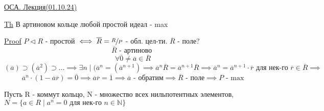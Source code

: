 \documentclass[a4paper]{article}
\begin{document}
\begin{center}
    \underline{ОСА. Лекция(01.10.24)}
\end{center}

\begin{tcolorbox}
    \underline{Th} В артиновом кольце любой простой идеал - max

    \underline{Proof} $ P \lhd R $ - простой $ \iff \overline{R} = \sfrac{R}{P}  $ 
    - обл. цел-ти. $ \overline{R} $ - поле?
    \[
        \overline{R} \text{ - артиново }
    \]
    \[
        \forall \overline{0} \neq \overline{a} \in \overline{R}
    \]
    \[
        (\overline{a}) \supset (\overline{a}^2) \supset \dots \implies
        \exists n \; |\; (\overline{a}^{n} = (\overline{a}^{n+1}) \implies
        \overline{a}^{n}\overline{R} = \overline{a}^{n+1}\overline{R} \implies
        \overline{a}^{n} = \overline{a}^{n+1}\cdot \overline{r}
        \text{ для нек-го } \overline{r} \in \overline{R} \implies
    \]
    \[
        \overline{a}^{n} \cdot (1 - \overline{a}\overline{r}) = \overline{0}
        \implies \overline{a}\overline{r} = \overline{1} \implies \overline{a}
        \text{ - обратим} \implies \overline{R} \text{ - поле} \implies
        P \text{ - max}
    \]
\end{tcolorbox}

Пусть R - коммут кольцо, N - множество всех нильпотентных элементов,
$ N = \{ a \in R \; | \; a^{n}= 0 \text{ для нек-го } n \in \mathbb{N} \}  $ 
\end{document}
